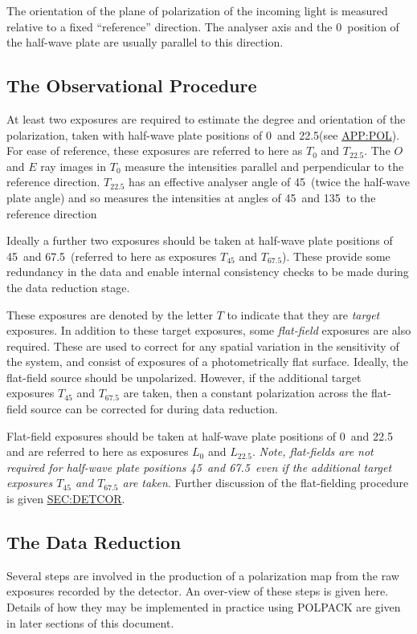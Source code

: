 The orientation of the plane of polarization of the incoming light is
measured relative to a fixed ``reference'' direction. The analyser axis
and the 0\dgs\ position of the half-wave plate are usually parallel to
this direction. 

\subsection{\label{SEC:OBS}The Observational Procedure}
At least two exposures are required to estimate the degree and
orientation of the polarization, taken with half-wave plate positions of
0\dgs\ and 22.5\dgs (see \hyperref{here}{appendix }{}{APP:POL}). For ease
of reference, these exposures are referred to here as $T_{0}$ and
$T_{22.5}$. The $O$ and $E$ ray images in $T_{0}$ measure the intensities
parallel and perpendicular to the reference direction. $T_{22.5}$ has an
effective analyser angle of 45\dgs\ (twice the half-wave plate angle) and
so measures the intensities at angles of 45\dgs\ and 135\dgs\ to the
reference direction

Ideally a further two exposures should be taken at half-wave plate
positions of 45\dgs\ and 67.5\dgs\ (referred to here as exposures
$T_{45}$ and $T_{67.5}$). These provide some redundancy in the data and 
enable internal consistency checks to be made during the data reduction
stage. 

These exposures are denoted by the letter $T$ to indicate that they are
{\em target} exposures. In addition to these target exposures, some {\em
flat-field} exposures are also required. These are used to correct for
any spatial variation in the sensitivity of the system, and consist of
exposures of a photometrically flat surface. Ideally, the flat-field
source should be unpolarized. However, if the additional target exposures
$T_{45}$ and $T_{67.5}$ are taken, then a constant polarization across
the flat-field source can be corrected for during data reduction.

Flat-field exposures should be taken at half-wave plate positions of
0\dgs\ and 22.5\dgs\, and are referred to here as exposures $L_{0}$ and 
$L_{22.5}$. {\em Note, flat-fields are not required for half-wave plate
positions 45\dgs\ and 67.5\dgs\ even if the additional target exposures
$T_{45}$ and $T_{67.5}$ are taken}. Further discussion of the flat-fielding
procedure is given \hyperref{here}{in section }{}{SEC:DETCOR}.

\subsection{The Data Reduction}
Several steps are involved in the production of a polarization map from
the raw exposures recorded by the detector. An over-view of these steps
is given here. Details of how they may be implemented in practice using
POLPACK are given in later sections of this document.

